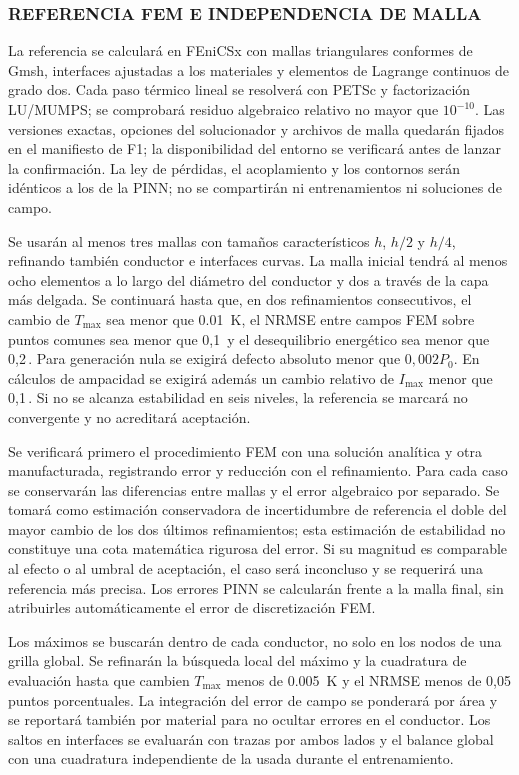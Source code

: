 \subsubsection{REFERENCIA FEM E INDEPENDENCIA DE MALLA}
\label{subsec:referencia-fem}
La referencia se calculará en FEniCSx con mallas triangulares conformes de Gmsh, interfaces ajustadas a los materiales y elementos de Lagrange continuos de grado dos. Cada paso térmico lineal se resolverá con PETSc y factorización LU/MUMPS; se comprobará residuo algebraico relativo no mayor que $10^{-10}$. Las versiones exactas, opciones del solucionador y archivos de malla quedarán fijados en el manifiesto de F1; la disponibilidad del entorno se verificará antes de lanzar la confirmación. La ley de pérdidas, el acoplamiento y los contornos serán idénticos a los de la PINN; no se compartirán ni entrenamientos ni soluciones de campo.

Se usarán al menos tres mallas con tamaños característicos $h$, $h/2$ y $h/4$, refinando también conductor e interfaces curvas. La malla inicial tendrá al menos ocho elementos a lo largo del diámetro del conductor y dos a través de la capa más delgada. Se continuará hasta que, en dos refinamientos consecutivos, el cambio de $T_{\max}$ sea menor que \SI{0.01}{\kelvin}, el NRMSE entre campos FEM sobre puntos comunes sea menor que 0,1\,\pct{} y el desequilibrio energético sea menor que 0,2\,\pct{}. Para generación nula se exigirá defecto absoluto menor que $0{,}002P_0$. En cálculos de ampacidad se exigirá además un cambio relativo de $I_{\max}$ menor que 0,1\,\pct{}. Si no se alcanza estabilidad en seis niveles, la referencia se marcará no convergente y no acreditará aceptación.

Se verificará primero el procedimiento FEM con una solución analítica y otra manufacturada, registrando error y reducción con el refinamiento. Para cada caso se conservarán las diferencias entre mallas y el error algebraico por separado. Se tomará como estimación conservadora de incertidumbre de referencia el doble del mayor cambio de los dos últimos refinamientos; esta estimación de estabilidad no constituye una cota matemática rigurosa del error. Si su magnitud es comparable al efecto o al umbral de aceptación, el caso será inconcluso y se requerirá una referencia más precisa. Los errores PINN se calcularán frente a la malla final, sin atribuirles automáticamente el error de discretización FEM.

Los máximos se buscarán dentro de cada conductor, no solo en los nodos de una grilla global. Se refinarán la búsqueda local del máximo y la cuadratura de evaluación hasta que cambien $T_{\max}$ menos de \SI{0.005}{\kelvin} y el NRMSE menos de 0,05 puntos porcentuales. La integración del error de campo se ponderará por área y se reportará también por material para no ocultar errores en el conductor. Los saltos en interfaces se evaluarán con trazas por ambos lados y el balance global con una cuadratura independiente de la usada durante el entrenamiento.

